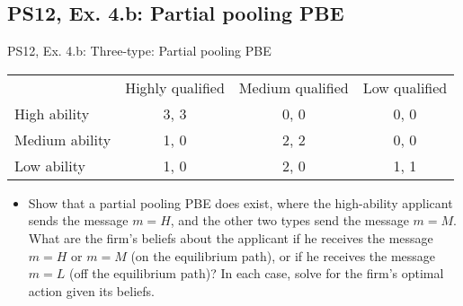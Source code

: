 \subsection{PS12, Ex. 4.b: Partial pooling PBE}

\begin{frame}{PS12, Ex. 4.b: Three-type: Partial pooling PBE}
    \begin{table}
      \begin{tabular}{l|c|c|c|}
          \multicolumn{1}{c}{} & \multicolumn{1}{c}{Highly qualified} & \multicolumn{1}{c}{Medium qualified} & \multicolumn{1}{c}{Low qualified} \\\cline{2-4}
          High ability   & 3, 3 & 0, 0 & 0, 0 \\\cline{2-4}
          Medium ability & 1, 0 & 2, 2 & 0, 0 \\\cline{2-4}
          Low ability    & 1, 0 & 2, 0 & 1, 1 \\\cline{2-4}
      \end{tabular}
    \end{table}\vspace{-8pt}
    \begin{itemize}
      \item[(b)] Show that a partial pooling PBE does exist, where the high-ability applicant sends the message $m = H$, and the other two types send the message $m = M$. What are the firm’s beliefs about the applicant if he receives the message $m = H$ or $m = M$ (on the equilibrium path), or if he receives the message $m = L$ (off the equilibrium path)? In each case, solve for the firm’s optimal action given its beliefs.
    \end{itemize}\vspace{-6pt}
    \vfill\null
\end{frame}
